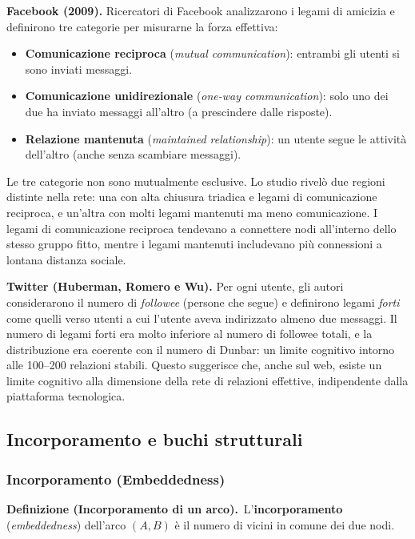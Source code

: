\documentclass[12pt,a4paper]{article}
\newcommand{\definition}[2]{%
  \vspace{4pt}%
  \noindent\textbf{Definizione (#1).}\ #2\par\vspace{4pt}%
}
\begin{document}
\textbf{Facebook (2009).}
Ricercatori di Facebook analizzarono i legami di amicizia e definirono tre categorie
per misurarne la forza effettiva:
\begin{itemize}
  \item \textbf{Comunicazione reciproca} (\textit{mutual communication}): entrambi gli
        utenti si sono inviati messaggi.
  \item \textbf{Comunicazione unidirezionale} (\textit{one-way communication}): solo uno
        dei due ha inviato messaggi all'altro (a prescindere dalle risposte).
  \item \textbf{Relazione mantenuta} (\textit{maintained relationship}): un utente segue
        le attività dell'altro (anche senza scambiare messaggi).
\end{itemize}
Le tre categorie non sono mutualmente esclusive. Lo studio rivelò due regioni distinte
nella rete: una con alta chiusura triadica e legami di comunicazione reciproca, e un'altra
con molti legami mantenuti ma meno comunicazione. I legami di comunicazione reciproca
tendevano a connettere nodi all'interno dello stesso gruppo fitto, mentre i legami
mantenuti includevano più connessioni a lontana distanza sociale.

\textbf{Twitter (Huberman, Romero e Wu).}
Per ogni utente, gli autori considerarono il numero di \textit{followee} (persone che
segue) e definirono legami \emph{forti} come quelli verso utenti a cui l'utente aveva
indirizzato almeno due messaggi. Il numero di legami forti era molto inferiore al numero
di followee totali, e la distribuzione era coerente con il numero di Dunbar: un limite
cognitivo intorno alle 100–200 relazioni stabili. Questo suggerisce che, anche sul web,
esiste un limite cognitivo alla dimensione della rete di relazioni effettive, indipendente
dalla piattaforma tecnologica.

\subsection{Incorporamento e buchi strutturali}

\subsubsection{Incorporamento (Embeddedness)}

\definition{Incorporamento di un arco}{L'\textbf{incorporamento} (\textit{embeddedness})
dell'arco $(A,B)$ è il numero di vicini in comune dei due nodi.}
\end{document}
